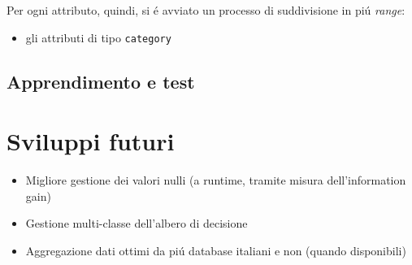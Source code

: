 \documentclass[preprint]{acm_proc_article-sp}
\begin{document}
Per ogni attributo, quindi, si \'e avviato un processo di suddivisione in pi\'u \textit{range}:
\begin{itemize}
\item gli attributi di tipo \verb|category| 
\end{itemize}

\subsection{Apprendimento e test}
\label{prolog-learner}

\section{Sviluppi futuri}
\label{sviluppi-futuri}

\begin{itemize}
\item Migliore gestione dei valori nulli (a runtime, tramite misura dell'information gain)
\item Gestione multi-classe dell'albero di decisione
\item Aggregazione dati ottimi da pi\'u database italiani e non (quando disponibili)
\end{itemize}

%
\balancecolumns

\end{document}
